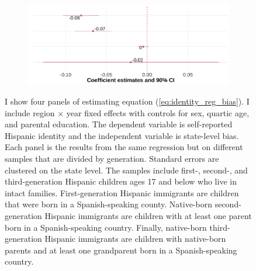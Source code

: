 \documentclass[12pt, fullpage]{article}
\newcommand{\note}[1]{\flushleft\footnotesize{#1}}
\begin{document}
\begin{center}
\begin{figure}[H]
\begin{subfigure}{.48\textwidth}
\centering
\includegraphics[width=.9\linewidth]{figure/skin-iat-regression-third-gen.png}
\end{subfigure}
\flushleft\footnotesize{\note{I show four panels of estimating equation (\ref{eq:identity_reg_bias}). I include region $\times$ year fixed effects with controls for sex, quartic age, and parental education. The dependent variable is self-reported Hispanic identity and the independent variable is state-level bias. Each panel is the results from the same regression but on different samples that are divided by generation. Standard errors are clustered on the state level. The samples include first-, second-, and third-generation Hispanic children ages 17 and below who live in intact families. First-generation Hispanic immigrants are children that were born in a Spanish-speaking county. Native-born second-generation Hispanic immigrants are children with at least one parent born in a Spanish-speaking country. Finally, native-born third-generation Hispanic immigrants are children with native-born parents and at least one grandparent born in a Spanish-speaking country.}}
\end{figure}
\end{center}
\end{document}
